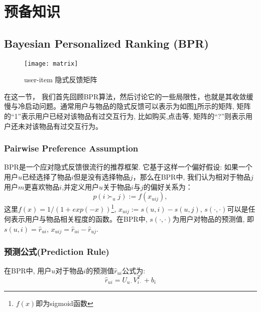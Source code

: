 \section{预备知识}

\subsection{Bayesian Personalized Ranking (BPR)}
\begin{figure}[htbp]
	\begin{center}
		\texttt{[image: matrix]}
		\caption{user-item 隐式反馈矩阵}
		\label{gra3}
	\end{center}
\end{figure}
在这一节， 我们首先回顾BPR算法，然后讨论它的一些局限性，也就是其收敛缓慢与冷启动问题。通常用户与物品的隐式反馈可以表示为如图\ref{gra3}所示的矩阵, 矩阵的“1”表示用户已经对该物品有过交互行为, 比如购买,点击等, 矩阵的“?”则表示用户还未对该物品有过交互行为。

\subsubsection{Pairwise Preference Assumption}
BPR\cite{rendle2009bpr}是一个应对隐式反馈很流行的推荐框架. 它基于这样一个偏好假设: 如果一个用户$u$已经选择了物品$i$但是没有选择物品$j$，那么在BPR中, 我们认为相对于物品$j$用户$m$更喜欢物品$i$,并定义用户$u$关于物品$i$与$j$的偏好关系为：
\begin{equation}
\label{pairwisepre}
p \left( i \succ_u j \right) := f \left( x_{uij} \right),
\end{equation}
这里$f \left(x\right) = 1/\left(1+exp\left(-x\right)\right)$\footnote{$f \left(x\right)$即为sigmoid函数}, $x_{uij} := s\left(u,i\right) - s\left(u,j\right)$, $s\left(\cdot,\cdot\right)$可以是任何表示用户与物品相关程度的函数。在BPR\cite{rendle2009bpr}中, $s\left(\cdot,\cdot\right)$为用户对物品的预测值, 即$s\left(u,i\right) = \hat{r}_{ui}$, $x_{uij} = \hat{r}_{ui}-\hat{r}_{uj}$.


\subsubsection{预测公式(Prediction Rule)}

在BPR中, 用户$u$对于物品$i$的预测值$\hat{r}_{ui}$公式为:
\begin{equation}
\hat{r}_{ui} = U_{u\cdot}V_{i\cdot}^T + b_i
\end{equation}



